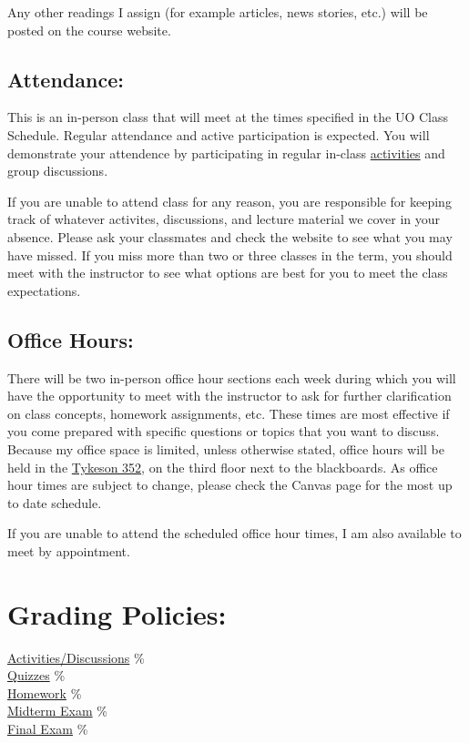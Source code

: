   \noindent Any other readings I assign (for example articles, news stories, etc.) will be posted on the course website.

\hypertarget{attendance policy}{\subsection{Attendance:}}

This is an in-person class that will meet at the times specified in the UO Class Schedule.
Regular attendance and active participation is expected.
You will demonstrate your attendence by participating in regular in-class \hyperlink{grade:activity}{activities} and group discussions.

If you are unable to attend class for any reason,
you are responsible for keeping track of whatever activites, discussions, and lecture material we cover in your absence.
Please ask your classmates and check the website to see what you may have missed.
If you miss more than two or three classes in the term, you should meet with the instructor to see what options are best for you to meet the class expectations.
 
\subsection{Office Hours:}

There will be two in-person office hour sections each week 
during which you will have the opportunity to meet with the instructor to ask for further clarification on class concepts,
homework assignments, etc.
These times are most effective if you come prepared with specific questions or topics that you want to discuss.
Because my office space is limited, unless otherwise stated, office hours will be held in the \href{https://map.uoregon.edu/aeddb7eca}{Tykeson 352},
on the third floor next to the blackboards.
As office hour times are subject to change, please check the Canvas page for the most up to date schedule.

If you are unable to attend the scheduled office hour times, I am also available to meet by appointment.

\section{Grading Policies:} 

\begin{center}\begin{minipage}{3.8in}\begin{flushleft}
    \hyperlink{grade:activity}{Activities/Discussions} \% \\
    \hyperlink{grade:quiz}{Quizzes}        \% \\
    \hyperlink{grade:HW}{Homework}         \% \\
    \hyperlink{grade:exam}{Midterm Exam}   \% \\
    \hyperlink{grade:exam}{Final Exam}     \% \\
\end{flushleft}\end{minipage}\end{center}

